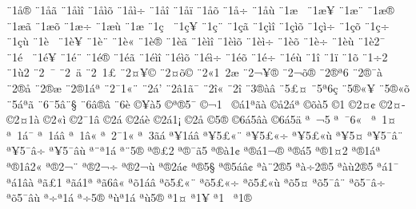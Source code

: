 {^^a81^^e5^^ae
^^a81^^e5^^e3
^^a81^^e5^^ec^^ee
^^a81^^e5^^ec^^f5
^^a81^^e5^^ec^^f7
^^a81^^e5^^ee
^^a81^^e5^^ef
^^a81^^e5^^f5
^^a81^^e5^^f7
^^a81^^e5^^f9
^^a81^^e6^^a0
^^a81^^e6^^a5
^^a81^^e6^^a8
^^a81^^e6^^ae
^^a81^^e6^^e3
^^a81^^e6^^f5
^^a81^^e6^^f7
^^a81^^e6^^f9
^^a81^^e6
^^a81^^e7^^a0
^^a81^^e7^^a5
^^a81^^e7^^a8
^^a81^^e7^^e3
^^a81^^e7^^ec^^ee
^^a81^^e7^^ec^^f5
^^a81^^e7^^ec^^f7
^^a81^^e7^^f5
^^a81^^e7^^f7
^^a81^^e7^^f9
^^a81^^e8^^a0
^^a81^^e8^^a5
^^a81^^e8^^a8
^^a81^^e8^^ab
^^a81^^e8^^ae
^^a81^^e8^^e3
^^a81^^e8^^ec^^ee
^^a81^^e8^^ec^^f5
^^a81^^e8^^ec^^f7
^^a81^^e8^^f5
^^a81^^e8^^f7
^^a81^^e8^^f9
^^a81^^e82^^af
^^a81^^e9^^a0
^^a81^^e9^^a5
^^a81^^e9^^a8
^^a81^^e9^^ae
^^a81^^e9^^e3
^^a81^^e9^^ec^^ee
^^a81^^e9^^ec^^f5
^^a81^^e9^^ec^^f7
^^a81^^e9^^f5
^^a81^^e9^^f7
^^a81^^e9^^f9
^^a81^^ee
^^a81^^ef
^^a81^^f5
^^a81^^f72
^^a81^^f92
^^a82^^a0^^af
^^a82^^a0^^e4
^^a82^^a01^^a3
^^a82^^a4^^a5^^a9
^^a82^^a4^^f5^^a9
^^a82^^ab1^^a02^^e6
^^a82^^ac^^a5^^ad^^ae
^^a82^^ac^^f5^^ad^^ae
^^a82^^ae^^aa6
^^a82^^ae^^af^^e0
^^a82^^ae^^e5
^^a82^^ae^^e6
^^a82^^ae1^^e1^^aa
^^a82^^af1^^ab^^a8
^^a82^^e1'
^^a82^^e21^^e3^^af
^^a82^^ee^^ab
^^a82^^ee^^ad
^^a83^^ae^^e0^^e2
^^a85^^a3^^a4
^^a85^^aa6^^e7
^^a85^^ae^^ab^^a5
^^a85^^ae^^ab^^f5
^^a85^^e1^^aa^^e3
^^a86^^af5^^e2^^a8^^a7
^^a86^^e2^^ae^^e2
^^a86^^e8^^ad
^^a9^^a5^^e05
^^a9^^aa^^ae5^^af
^^a9^^ac1^^a0
^^a9^^e11^^aa^^e3^^e0
^^a9^^e52^^e1^^aa
^^a9^^f5^^e05
^^a91
^^a92^^a4^^a2
^^a92^^a4^^ad
^^a92^^a41^^e0
^^a92^^ab^^ec
^^a92^^af1^^e2
^^a92^^e1^^ad
^^a92^^e1^^e8
^^a92^^e11^^a1
^^a92^^e5
^^a95^^ae
^^a96^^e15^^e2^^e0
^^a96^^e15^^e4
^^aa^^a0^^ac5^^ad
^^aa^^a0^^af6^^ab^^a0
^^aa^^a01^^a4
^^aa^^a01^^e1^^af
^^aa^^a01^^e1^^e2
^^aa^^a01^^e2^^ab
^^aa^^a02^^af1^^ab
^^aa^^a03^^e3^^e1
^^aa^^a51^^e1^^e2
^^aa^^a55^^a3^^ab^^a8
^^aa^^a55^^a3^^ab^^f7
^^aa^^a55^^a3^^ab^^f9
^^aa^^a55^^a4
^^aa^^a55^^af^^e2^^a8
^^aa^^a55^^af^^e2^^f7
^^aa^^a55^^af^^e2^^f9
^^aa^^a8^^aa1^^e1
^^aa^^a85^^ae
^^aa^^ae^^a32^^ad
^^aa^^ae^^af^^e35
^^aa^^ae^^e01^^a2
^^aa^^ae^^e11^^ac^^ae
^^aa^^ae^^e15^^ad
^^aa^^ae1^^a42^^ad
^^aa^^ae1^^e1^^aa
^^aa^^ae1^^e22^^ab
^^aa^^ae2^^ac^^a8^^ad
^^aa^^ae2^^ac^^f7^^ad
^^aa^^ae2^^ac^^f9^^ad
^^aa^^ae2^^e1^^a2
^^aa^^ae5^^a7^^ad
^^aa^^ae5^^e1^^e2^^a2
^^aa^^e0^^a82^^ae5
^^aa^^e0^^f72^^ae5
^^aa^^e0^^f92^^ae5
^^aa^^e11^^af
^^aa^^e11^^e2^^e0
^^aa^^e3^^a31
^^aa^^e3^^e11^^aa
^^aa^^e36^^e2^^ab
^^aa^^f51^^e1^^e2
^^aa^^f55^^a3^^ab^^a8
^^aa^^f55^^a3^^ab^^f7
^^aa^^f55^^a3^^ab^^f9
^^aa^^f55^^a4
^^aa^^f55^^af^^e2^^a8
^^aa^^f55^^af^^e2^^f7
^^aa^^f55^^af^^e2^^f9
^^aa^^f7^^aa1^^e1
^^aa^^f75^^ae
^^aa^^f9^^aa1^^e1
^^aa^^f95^^ae
^^aa1^^a4
^^aa1^^a5
^^aa1^^ad^^a0
^^aa1^^ad^^ae
}
